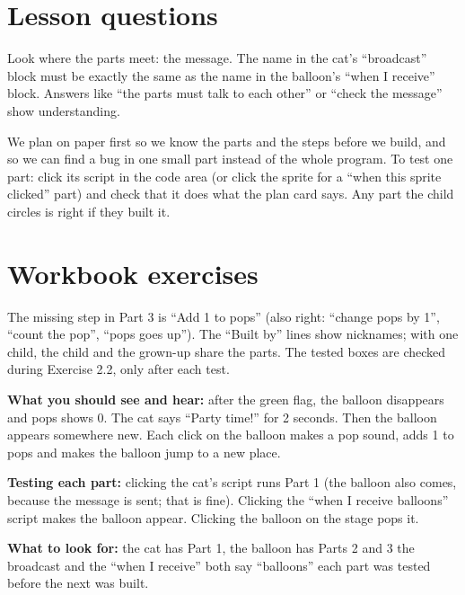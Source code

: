 
\section{Lesson questions}
\begin{answer}
Look where the parts meet: the message. The name in the cat's \enquote{broadcast} block must be exactly the same as the name in the balloon's \enquote{when I receive} block. Answers like \enquote{the parts must talk to each other} or \enquote{check the message} show understanding.
\end{answer}

\begin{answer}[Reflection]
We plan on paper first so we know the parts and the steps before we build, and so we can find a bug in one small part instead of the whole program. To test one part: click its script in the code area (or click the sprite for a \enquote{when this sprite clicked} part) and check that it does what the plan card says. Any part the child circles is right if they built it.
\end{answer}

\section{Workbook exercises}
\begin{answer}
The missing step in Part 3 is \enquote{Add 1 to pops} (also right: \enquote{change pops by 1}, \enquote{count the pop}, \enquote{pops goes up}). The \enquote{Built by} lines show nicknames; with one child, the child and the grown-up share the parts. The tested boxes are checked during Exercise 2.2, only after each test.
\end{answer}

\begin{answer}
\textbf{What you should see and hear:} after the green flag, the balloon disappears and pops shows 0. The cat says \enquote{Party time!} for 2 seconds. Then the balloon appears somewhere new. Each click on the balloon makes a pop sound, adds 1 to pops and makes the balloon jump to a new place.

\textbf{Testing each part:} clicking the cat's script runs Part 1 (the balloon also comes, because the message is sent; that is fine). Clicking the \enquote{when I receive balloons} script makes the balloon appear. Clicking the balloon on the stage pops it.

\textbf{What to look for:} \tickbox{} the cat has Part 1, the balloon has Parts 2 and 3 \quad \tickbox{} the broadcast and the \enquote{when I receive} both say \enquote{balloons} \quad \tickbox{} each part was tested before the next was built.
\end{answer}

